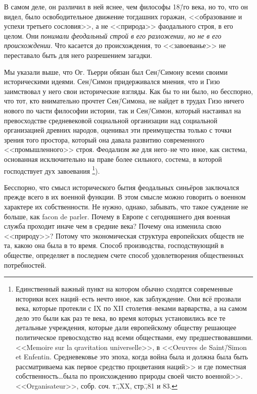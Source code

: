 В самом деле, он различил в ней яснее, чем философы 18\=/го века, но то, что он видел, было освободительное движение тогдашних горажан, <<образование и успехи третьего сословия>>, а не <<природа>> фаодального строя, в его целом. Они \emph{понимали феодальный строй в его разложении, но не в его происхождении.} Что касается до происхождения, то <<завоеванье>> не переставало быть для него разрешением загадки.

Мы указали выше, что Ог. Тьерри обязан был Сен\=/Симону всеми своими историческими идеями. Сен\=/Симон придерживался мнения, что и Гизо заимствовал у него свои исторические взгляды. Как бы то ни было, но бесспорно, что тот, кто внимательно прочтет Сен\=/Симона, не найдет в трудах Гизо ничего нового по части философии истории, так и Сен\=/Симон, который настаивал на превосходстве средневековой социальной организации над социальной организацией древних народов, оценивал эти преимущества только с точки зрения того простора, который она давала развитию современного <<промышленного>> строя. Феодализм же для него\---не что иное, как система, основанная исключительно на праве более сильного, состема, в которой господствует дух завоевания \footnote{Единственный важный пункт на котором обычно сходятся современные историки всех наций\---есть нечто иное, как заблуждение. Они всё прозвали века, которые протекли с IX по XII столетия\---веками варварства, а на самом дело это были как раз те века, во время которых установились все те детальные учреждения, которые дали европейскому обществу решающее политическое превосходство над всеми обществами, ему предшествовавшими. <<Memoire sur la qravitation universelle>>, в <<Oeuvres de Saint\=/Simon et Enfentin. Средневековье это эпоха, когда война была и должна была быть рассматриваема как первое средство процветания наций>> и где поместная собственность\dots была по происхождению природы своей чисто военной>>. <<Organisateur>>, собр. соч. т.\=,XX, стр.\=,81 и 83.}).

Бесспорно, что смысл исторического бытия феодальных синьёров заключался прежде всего в их военной функции. В этом смысле можно говорить о военном характере их собственности. Не нужно, однако, забывать, что такое суждение не больше, как facon de parler. Почему в Европе с сегодняшнего дня военная служба проходит иначе чем в средние века? Почему она изменила свою <<природу>>? Потому что экономическая структура европейских обществ не та, какою она была в то время. Способ производства, господствующий в обществе, определяет в последнем счете способ удовлетворения общественных потребностей.

